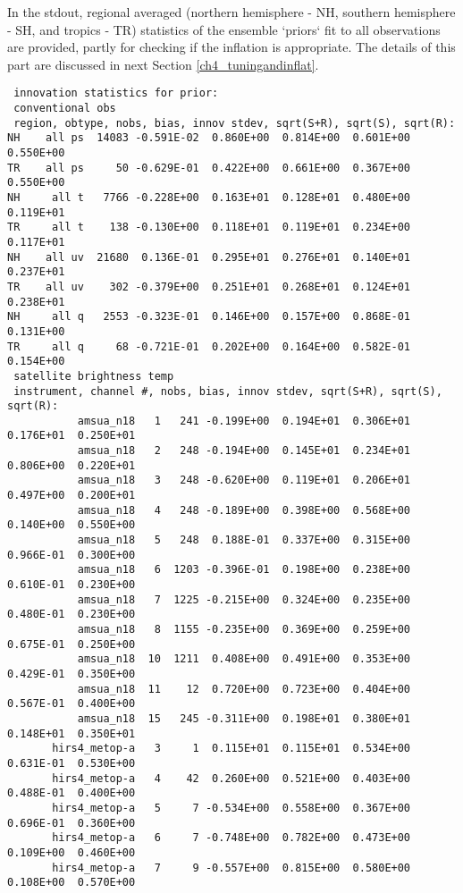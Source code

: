 In the stdout, regional averaged (northern hemisphere - NH, southern hemisphere - SH, and tropics - TR) statistics of the ensemble `priors` fit to all observations are provided, partly for checking if the inflation is appropriate. The details of this part are discussed in next Section \ref{ch4_tuningandinflat}.
\begin{scriptsize}
\begin{verbatim}
 innovation statistics for prior:
 conventional obs
 region, obtype, nobs, bias, innov stdev, sqrt(S+R), sqrt(S), sqrt(R):
NH    all ps  14083 -0.591E-02  0.860E+00  0.814E+00  0.601E+00  0.550E+00
TR    all ps     50 -0.629E-01  0.422E+00  0.661E+00  0.367E+00  0.550E+00
NH     all t   7766 -0.228E+00  0.163E+01  0.128E+01  0.480E+00  0.119E+01
TR     all t    138 -0.130E+00  0.118E+01  0.119E+01  0.234E+00  0.117E+01
NH    all uv  21680  0.136E-01  0.295E+01  0.276E+01  0.140E+01  0.237E+01
TR    all uv    302 -0.379E+00  0.251E+01  0.268E+01  0.124E+01  0.238E+01
NH     all q   2553 -0.323E-01  0.146E+00  0.157E+00  0.868E-01  0.131E+00
TR     all q     68 -0.721E-01  0.202E+00  0.164E+00  0.582E-01  0.154E+00
 satellite brightness temp
 instrument, channel #, nobs, bias, innov stdev, sqrt(S+R), sqrt(S), sqrt(R):
           amsua_n18   1   241 -0.199E+00  0.194E+01  0.306E+01  0.176E+01  0.250E+01
           amsua_n18   2   248 -0.194E+00  0.145E+01  0.234E+01  0.806E+00  0.220E+01
           amsua_n18   3   248 -0.620E+00  0.119E+01  0.206E+01  0.497E+00  0.200E+01
           amsua_n18   4   248 -0.189E+00  0.398E+00  0.568E+00  0.140E+00  0.550E+00
           amsua_n18   5   248  0.188E-01  0.337E+00  0.315E+00  0.966E-01  0.300E+00
           amsua_n18   6  1203 -0.396E-01  0.198E+00  0.238E+00  0.610E-01  0.230E+00
           amsua_n18   7  1225 -0.215E+00  0.324E+00  0.235E+00  0.480E-01  0.230E+00
           amsua_n18   8  1155 -0.235E+00  0.369E+00  0.259E+00  0.675E-01  0.250E+00
           amsua_n18  10  1211  0.408E+00  0.491E+00  0.353E+00  0.429E-01  0.350E+00
           amsua_n18  11    12  0.720E+00  0.723E+00  0.404E+00  0.567E-01  0.400E+00
           amsua_n18  15   245 -0.311E+00  0.198E+01  0.380E+01  0.148E+01  0.350E+01
       hirs4_metop-a   3     1  0.115E+01  0.115E+01  0.534E+00  0.631E-01  0.530E+00
       hirs4_metop-a   4    42  0.260E+00  0.521E+00  0.403E+00  0.488E-01  0.400E+00
       hirs4_metop-a   5     7 -0.534E+00  0.558E+00  0.367E+00  0.696E-01  0.360E+00
       hirs4_metop-a   6     7 -0.748E+00  0.782E+00  0.473E+00  0.109E+00  0.460E+00
       hirs4_metop-a   7     9 -0.557E+00  0.815E+00  0.580E+00  0.108E+00  0.570E+00

\end{verbatim}
\end{scriptsize}
